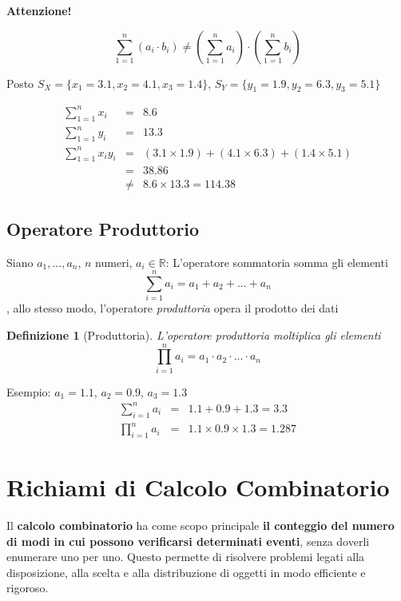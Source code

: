 \documentclass[
  11pt,
]{book}
\theoremstyle{mytheoremstyle}
\theoremstyle{mydefstyle}
\newtheorem{definition}{Definizione}[section]
\begin{document}
\textbf{Attenzione!}

\[
\sum_{1=1}^n (a_i \cdot b_i) \ne \left(\sum_{1=1}^n  a_i \right)\cdot\left(\sum_{1=1}^n  b_i\right)
\]

Posto \(S_X=\{x_1 = 3.1,x_2 = 4.1, x_3 = 1.4\}\),
\(S_Y=\{y_1 = 1.9,y_2 = 6.3, y_3 = 5.1\}\)

\begin{eqnarray*}
\sum_{1=1}^n x_i    &=&  8.6\\
\sum_{1=1}^n y_i    &=&  13.3\\
\sum_{1=1}^n x_i y_i   &=&  ( 3.1 \times 1.9 )+( 4.1 \times 6.3 )+( 1.4 \times 5.1 )\\
 &=& 38.86\\
 &\ne& 8.6\times 13.3=114.38
\end{eqnarray*}

\section{Operatore Produttorio}\label{operatore-produttorio}

Siano \(a_1,...,a_n\), \(n\) numeri, \(a_i\in\mathbb{R}\):
L'operatore sommatoria somma gli elementi
\[\sum_{i=1}^n a_i=a_1+ a_2+ ...+ a_n\],
allo stesso modo, l'operatore \emph{produttoria} opera il prodotto dei dati

\begin{definition}[Produttoria]
L'operatore produttoria moltiplica gli elementi
\[\prod_{i=1}^n a_i=a_1\cdot a_2\cdot ...\cdot a_n\]
\end{definition}

Esempio: \(a_1=1.1\), \(a_2=0.9\), \(a_3=1.3\)
\begin{eqnarray*}
 \sum_{i=1}^n a_i &=& 1.1 + 0.9 + 1.3 = 3.3\\
 \prod_{i=1}^n a_i &=& 1.1 \times 0.9 \times 1.3 = 1.287
\end{eqnarray*}

\chapter{Richiami di Calcolo Combinatorio}\label{richiami-di-calcolo-combinatorio}

Il \textbf{calcolo combinatorio} ha come scopo principale \textbf{il conteggio del numero di modi in cui possono verificarsi determinati eventi}, senza doverli enumerare uno per uno. Questo permette di risolvere problemi legati alla disposizione, alla scelta e alla distribuzione di oggetti in modo efficiente e rigoroso.
\end{document}
